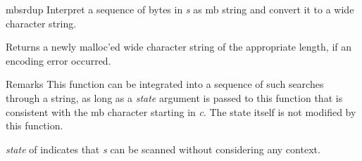 \begin{DoxyDocu}{mbsrdup}
\label{mbstrings_8h_a8aef5861ae9567fceeb52d82d3565a13_a8aef5861ae9567fceeb52d82d3565a13}
Interpret a sequence of bytes in {\itshape s} as mb string and convert it to a wide character string.

\begin{DoxyReturn}{Returns}
a newly malloc'ed wide character string of the appropriate length,  if an encoding error occurred.
\end{DoxyReturn}
\begin{DoxyRemark}{Remarks}
This function can be integrated into a sequence of such searches through a string, as long as a {\itshape state} argument is passed to this function that is consistent with the mb character starting in {\itshape c}. The state itself is not modified by this function.

{\itshape state} of  indicates that {\itshape s} can be scanned without considering any context.
\end{DoxyRemark}


\end{DoxyDocu}

